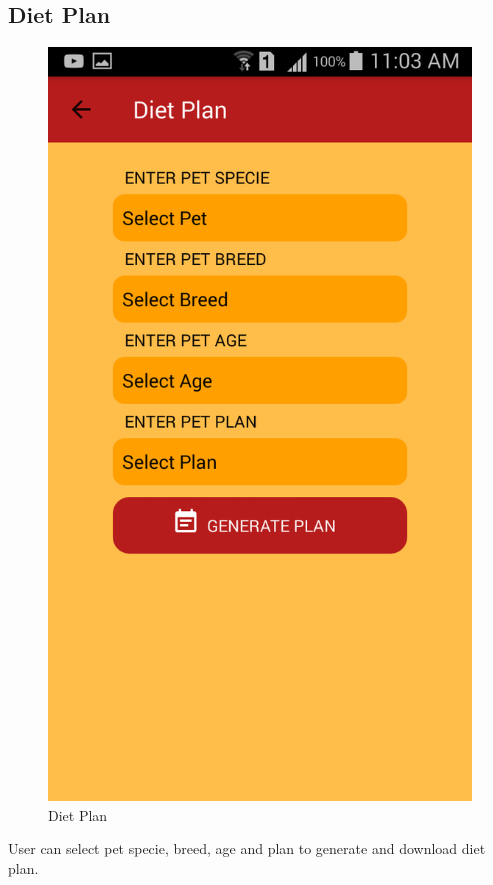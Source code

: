 \newpage
\subsection{Diet Plan}
\begin{figure}[H]
  \centering
    \includegraphics[scale=0.3]{86GenerateDietplan}
     \caption{Diet Plan}
\end{figure}

User can select pet specie, breed, age and plan to generate and download diet plan. 

